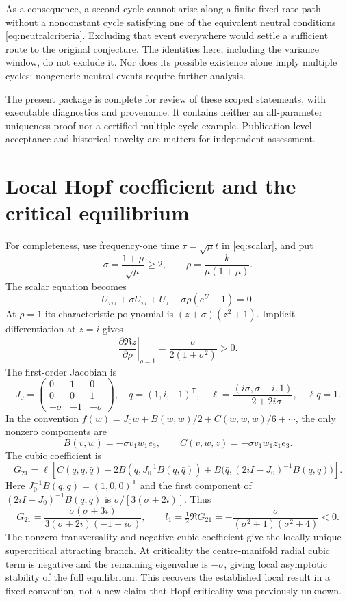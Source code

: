\documentclass[11pt,a4paper]{article}
\numberwithin{equation}{section}
\theoremstyle{remark}\newtheorem{remark}[theorem]{Remark}
\begin{document}
As a consequence, a second cycle cannot arise along a finite fixed-rate path without a nonconstant cycle satisfying one of the equivalent neutral conditions \eqref{eq:neutralcriteria}. Excluding that event everywhere would settle a sufficient route to the original conjecture. The identities here, including the variance window, do not exclude it. Nor does its possible existence alone imply multiple cycles: nongeneric neutral events require further analysis.

The present package is complete for review of these scoped statements, with executable diagnostics and provenance. It contains neither an all-parameter uniqueness proof nor a certified multiple-cycle example. Publication-level acceptance and historical novelty are matters for independent assessment.

\appendix
\section{Local Hopf coefficient and the critical equilibrium}\label{app:hopf}
For completeness, use frequency-one time $\tau=\sqrt\mu t$ in \eqref{eq:scalar}, and put
\[
\sigma=\frac{1+\mu}{\sqrt\mu}\ge2,\qquad
\rho=\frac{k}{\mu(1+\mu)}.
\]
The scalar equation becomes
\[
U_{\tau\tau\tau}+\sigma U_{\tau\tau}+U_\tau+\sigma\rho(e^U-1)=0.
\]
At $\rho=1$ its characteristic polynomial is $(z+\sigma)(z^2+1)$. Implicit differentiation at $z=i$ gives
\[
\left.\frac{\partial\Re z}{\partial\rho}\right|_{\rho=1}
=\frac{\sigma}{2(1+\sigma^2)}>0.
\]
The first-order Jacobian is
\[
J_0=\begin{pmatrix}0&1&0\\0&0&1\\-\sigma&-1&-\sigma\end{pmatrix},\quad
q=(1,i,-1)^{\mathsf T},\quad
\ell=\frac{(i\sigma,\sigma+i,1)}{-2+2i\sigma},\quad \ell q=1.
\]
In the convention $f(w)=J_0w+B(w,w)/2+C(w,w,w)/6+\cdots$, the only nonzero components are
\[
B(v,w)=-\sigma v_1w_1e_3,\qquad
C(v,w,z)=-\sigma v_1w_1z_1e_3.
\]
The cubic coefficient is
\[
G_{21}=\ell\left[C(q,q,\bar q)-2B(q,J_0^{-1}B(q,\bar q))
+B\bigl(\bar q,(2iI-J_0)^{-1}B(q,q)\bigr)\right].
\]
Here $J_0^{-1}B(q,\bar q)=(1,0,0)^{\mathsf T}$ and the first component of $(2iI-J_0)^{-1}B(q,q)$ is $\sigma/[3(\sigma+2i)]$. Thus
\[
G_{21}=\frac{\sigma(\sigma+3i)}{3(\sigma+2i)(-1+i\sigma)},\qquad
l_1=\tfrac12\Re G_{21}
=-\frac{\sigma}{(\sigma^2+1)(\sigma^2+4)}<0.
\]
The nonzero transversality and negative cubic coefficient give the locally unique supercritical attracting branch. At criticality the centre-manifold radial cubic term is negative and the remaining eigenvalue is $-\sigma$, giving local asymptotic stability of the full equilibrium. This recovers the established local result in a fixed convention, not a new claim that Hopf criticality was previously unknown.
\end{document}
